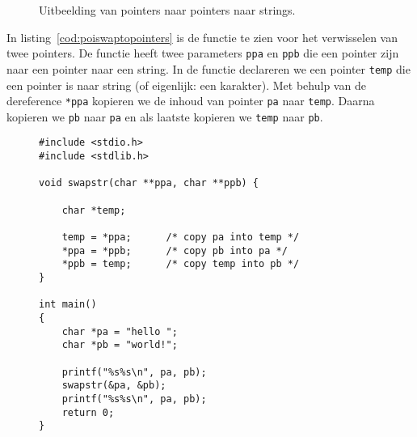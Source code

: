 \begin{figure}[!ht]
\centering
{}
\caption{Uitbeelding van pointers naar pointers naar strings.}
\label{fig:poipointertopointerstring}
\end{figure}

In listing~\ref{cod:poiswaptopointers} is de functie te zien voor het verwisselen van twee pointers. De functie heeft twee parameters \texttt{ppa} en \texttt{ppb} die een pointer zijn naar een pointer naar een string. In de functie declareren we een pointer \texttt{temp} die een pointer is naar string (of eigenlijk: een karakter). Met behulp van de dereference \texttt{*ppa} kopieren we de inhoud van pointer \texttt{pa} naar \texttt{temp}. Daarna kopieren we \texttt{pb} naar \texttt{pa} en als laatste kopieren we \texttt{temp} naar \texttt{pb}.

\begin{figure}[H]
\begin{lstlisting}[caption=Functie voor het verwisselen van twee pointers.,label=cod:poiswaptopointers]
#include <stdio.h>
#include <stdlib.h>

void swapstr(char **ppa, char **ppb) {

	char *temp;

    temp = *ppa;      /* copy pa into temp */
    *ppa = *ppb;      /* copy pb into pa */
    *ppb = temp;      /* copy temp into pb */
}

int main()
{
    char *pa = "hello ";
    char *pb = "world!";

    printf("%s%s\n", pa, pb);
    swapstr(&pa, &pb);
    printf("%s%s\n", pa, pb);
    return 0;
}
\end{lstlisting}
\end{figure}

